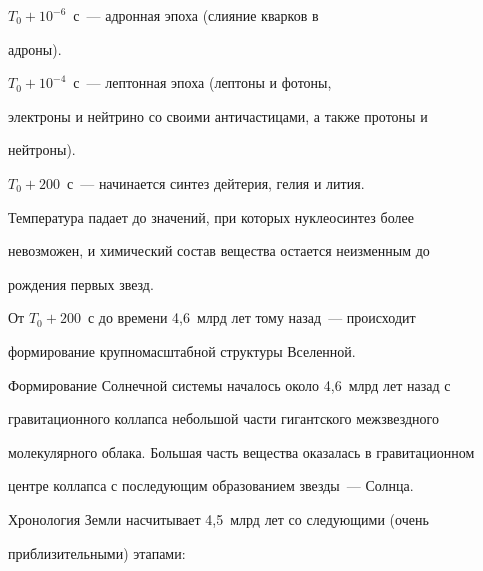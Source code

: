 $T_0 + 10^{-6}$~с~--- адронная эпоха (слияние кварков в 


адроны). 





$T_0 + 10^{-4}$~с~--- лептонная эпоха (лептоны и фотоны, 


электроны и нейтрино со своими античастицами, а также протоны и 


нейтроны).





$T_0 + 200$~с~--- начинается синтез дейтерия, гелия и лития. 


Температура падает до значений, при которых нуклеосинтез более 


невозможен, и химический состав вещества остается неизменным до 


рождения первых звезд.





   


   От $T_0 + 200$~с до времени 4,6~млрд лет тому назад~--- происходит 


формирование крупномасштабной структуры Вселенной.


   


   Формирование Солнечной системы началось около 4,6~млрд лет назад с 


гравитационного коллапса небольшой части гигантского межзвездного 


молекулярного облака. Большая часть вещества оказалась в гравитационном 


центре коллапса с последующим образованием звезды~--- Солнца.


   


   Хронология Земли насчитывает 4,5~млрд лет со следующими (очень 


приблизительными) этапами:


